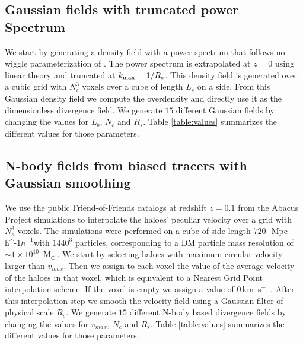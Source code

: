 \documentclass[usenatbib]{mnras}
\newcommand{\Msun}{\,{\rm M}$_{\odot}$\,}
\newcommand{\Mpch}{\,{\rm Mpc}\,\ifmmode h^{-1}\else $h^{-1}$\fi}
\newcommand{\kms}{\,{\rm km}\ s$^{-1}$\,}
\begin{document}
\subsection{Gaussian fields with truncated power Spectrum}

We start by generating a density field with a power spectrum that follows no-wiggle parameterization of \cite{1998ApJ...496..605E}.
The power spectrum is extrapolated at $z=0$ using linear theory and truncated at $k_{\rm max}=1/R_s$.
This density field is generated over a cubic grid with $N_c^3$ voxels over a cube of length $L_s$ on a side.
From this Gaussian density field we compute  the overdensity and directly use it as the dimensionless divergence field.
We generate $15$ different Gaussian fields by changing the values for $L_b$, $N_c$ and $R_s$. 
Table \ref{table:values} summarizes the different values for those parameters.

\subsection{N-body fields from biased tracers with Gaussian smoothing}

We use the public Friend-of-Friends catalogs at redshift $z=0.1$
from the Abacus Project simulations to interpolate the haloes' peculiar velocity over a grid with $N_s^3$ voxels.
The simulations were performed on a cube of side length $720$\ \Mpch with
$1440^3$ particles, corresponding to a DM particle mass resolution of $\sim 1 \times 10^{10}$ \Msun.
We start by selecting haloes with maximum circular velocity larger
than $v_{max}$.
Then we assign to each voxel the value of the average velocity of the haloes in that voxel, which is equivalent to a Nearest Grid Point interpolation scheme. 
If the voxel is empty we assign a value of $0$\kms.
After this interpolation step we smooth the velocity field using a Gaussian filter of physical scale $R_s$.
We generate $15$ different N-body based divergence fields by changing the values for $v_{max}$, $N_c$ and $R_s$. 
Table \ref{table:values} summarizes the different values for those parameters.
\end{document}
